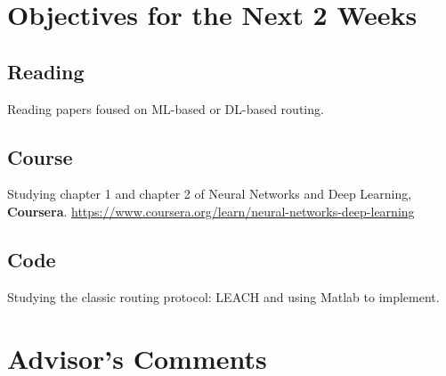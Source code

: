 \documentclass[11pt]{report}
\begin{document}
	\section{Objectives for the Next 2 Weeks}
	\subsection{Reading} 
	Reading papers foused on ML-based or DL-based routing.
	\subsection{Course} 
	Studying chapter 1 and chapter 2 of Neural Networks and Deep Learning, \textbf{Coursera}. \url{https://www.coursera.org/learn/neural-networks-deep-learning}
	\subsection{Code}
	Studying the classic routing protocol: LEACH and using Matlab to implement.
	
	\section{Advisor's Comments}
	
	
	
	
\end{document}
